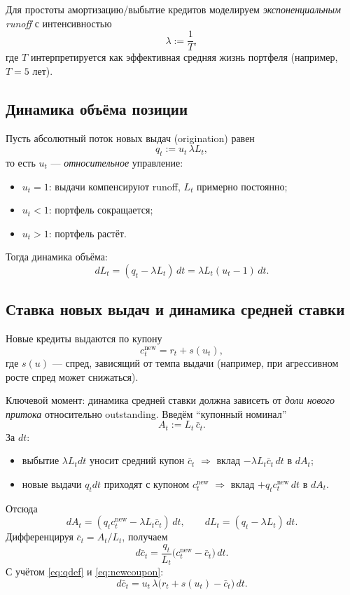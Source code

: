 \documentclass[11pt]{article}
\newcommand{\1}{\mathbf{1}}
\begin{document}
Для простоты амортизацию/выбытие кредитов моделируем \emph{экспоненциальным runoff} с интенсивностью
\[
\lambda := \frac{1}{T},
\]
где $T$ интерпретируется как эффективная средняя жизнь портфеля (например, $T=5$ лет).

\subsection{Динамика объёма позиции}
Пусть абсолютный поток новых выдач (origination) равен
\begin{equation}
q_t := u_t \,\lambda L_t,
\label{eq:qdef}
\end{equation}
то есть $u_t$ --- \emph{относительное} управление:
\begin{itemize}
  \item $u_t=1$: выдачи компенсируют runoff, $L_t$ примерно постоянно;
  \item $u_t<1$: портфель сокращается;
  \item $u_t>1$: портфель растёт.
\end{itemize}
Тогда динамика объёма:
\begin{equation}
dL_t = (q_t - \lambda L_t)\,dt = \lambda L_t (u_t-1)\,dt.
\label{eq:Ldyn}
\end{equation}

\subsection{Ставка новых выдач и динамика средней ставки}
Новые кредиты выдаются по купону
\begin{equation}
c_t^{\mathrm{new}} = r_t + s(u_t),
\label{eq:newcoupon}
\end{equation}
где $s(u)$ --- спред, зависящий от темпа выдачи (например, при агрессивном росте спред может снижаться).

Ключевой момент: динамика средней ставки должна зависеть от \emph{доли нового притока} относительно outstanding. Введём ``купонный номинал''
\[
A_t := L_t\,\bar c_t.
\]
За $dt$:
\begin{itemize}
  \item выбытие $\lambda L_t dt$ уносит средний купон $\bar c_t$ $\Rightarrow$ вклад $-\lambda L_t \bar c_t\,dt$ в $dA_t$;
  \item новые выдачи $q_t dt$ приходят с купоном $c_t^{\mathrm{new}}$ $\Rightarrow$ вклад $+q_t c_t^{\mathrm{new}}\,dt$ в $dA_t$.
\end{itemize}
Отсюда
\[
dA_t = (q_t c_t^{\mathrm{new}} - \lambda L_t \bar c_t)\,dt,
\qquad
dL_t = (q_t - \lambda L_t)\,dt.
\]
Дифференцируя $\bar c_t=A_t/L_t$, получаем
\begin{equation}
d\bar c_t = \frac{q_t}{L_t}\big(c_t^{\mathrm{new}}-\bar c_t\big)\,dt.
\label{eq:cbardyn_general}
\end{equation}
С учётом \eqref{eq:qdef} и \eqref{eq:newcoupon}:
\begin{equation}
d\bar c_t = u_t\,\lambda\big(r_t + s(u_t) - \bar c_t\big)\,dt.
\label{eq:cbardyn}
\end{equation}
\end{document}
